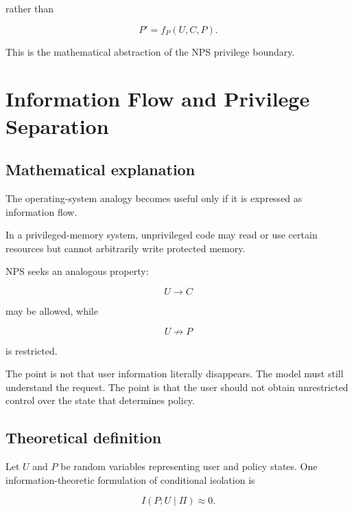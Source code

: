 \documentclass[11pt]{article}
\begin{document}
rather than

\begin{equation}
P'=f_P(U,C,P).
\end{equation}

This is the mathematical abstraction of the NPS privilege boundary.

\section{Information Flow and Privilege Separation}

\subsection*{Mathematical explanation}

The operating-system analogy becomes useful only if it is expressed as
information flow.

In a privileged-memory system, unprivileged code may read or use certain
resources but cannot arbitrarily write protected memory.

NPS seeks an analogous property:

\begin{equation}
U\rightarrow C
\end{equation}

may be allowed, while

\begin{equation}
U\not\rightarrow P
\end{equation}

is restricted.

The point is not that user information literally disappears. The model must
still understand the request. The point is that the user should not obtain
unrestricted control over the state that determines policy.

\subsection*{Theoretical definition}

Let $U$ and $P$ be random variables representing user and policy states.
One information-theoretic formulation of conditional isolation is

\begin{equation}
\boxed{
I(P;U\mid\Pi)\approx0.
}
\end{equation}
\end{document}
